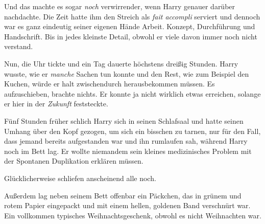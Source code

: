 Und das machte es sogar \emph{noch} verwirrender, wenn Harry genauer darüber nachdachte. Die Zeit hatte ihm den Streich als \emph{fait accompli} serviert und dennoch war es ganz eindeutig seiner eigenen Hände Arbeit. Konzept, Durchführung und Handschrift. Bis in jedes kleinste Detail, obwohl er viele davon immer noch nicht verstand.

Nun, die Uhr tickte und ein Tag dauerte höchstens dreißig Stunden. Harry wusste, wie er \emph{manche} Sachen tun konnte und den Rest, wie zum Beispiel den Kuchen, würde er halt zwischendurch herausbekommen müssen. Es aufzuschieben, brachte nichts. Er konnte ja nicht wirklich etwas erreichen, solange er hier in der \emph{Zukunft} feststeckte.

\later

Fünf Stunden früher schlich Harry sich in seinen Schlafsaal und hatte seinen Umhang über den Kopf gezogen, um sich ein bisschen zu tarnen, nur für den Fall, dass jemand bereits aufgestanden war und ihn rumlaufen sah, während Harry noch im Bett lag. Er wollte niemandem sein kleines medizinisches Problem mit der Spontanen Duplikation erklären müssen.

Glücklicherweise schliefen anscheinend alle noch.

Außerdem lag neben seinem Bett offenbar ein Päckchen, das in grünem und rotem Papier eingepackt und mit einem hellen, goldenen Band verschnürt war. Ein vollkommen typisches Weihnachtsgeschenk, obwohl es nicht Weihnachten war.

